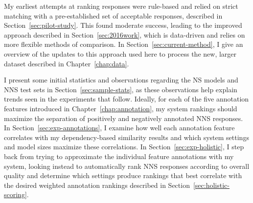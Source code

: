 My earliest attempts at ranking responses were rule-based and relied on strict matching with a pre-established set of acceptable responses, described in Section~\ref{sec:pilot-study}. This found moderate success, leading to the improved approach described in Section~\ref{sec:2016work}, which is data-driven and relies on more flexible methods of comparison.
In Section~\ref{sec:current-method}, I give an overview of the updates to this approach used here to process the new, larger dataset described in Chapter~\ref{chap:data}.


I present some initial statistics and observations regarding the NS models and NNS test sets in Section~\ref{sec:sample-stats}, as these observations help explain trends seen in the experiments that follow. 
Ideally, for each of the five annotation features introduced in Chapter~\ref{chap:annotation}, my system rankings should maximize the separation of positively and negatively annotated NNS responses.
In Section~\ref{sec:exp-annotations}, I examine how well each annotation feature correlates with my dependency-based similarity results and which system settings and model sizes maximize these correlations. In Section~\ref{sec:exp-holistic}, I step back from trying to approximate the individual feature annotations with my system, looking instead to automatically rank NNS responses according to overall quality and determine which settings produce rankings that best correlate with the desired weighted annotation rankings described in Section~\ref{sec:holistic-scoring}.


